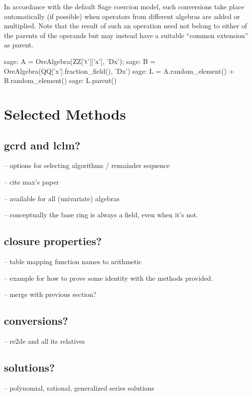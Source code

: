 \documentclass{amsart}
\begin{document}
In accordance with the default Sage coercion model, such conversions take place automatically (if possible) 
when operators from different algebras are added or multiplied. Note that the result of such an operation
need not belong to either of the parents of the operands but may instead have a suitable ``common extension'' 
as parent. 

\begin{sageexample}
  sage: A = OreAlgebra(ZZ['t']['x'], 'Dx'); 
  sage: B = OreAlgebra(QQ['x'].fraction_field(), 'Dx')
  sage: L = A.random_element() + B.random_element()
  sage: L.parent()
\end{sageexample}

\section{Selected Methods}\label{sec:4}

\subsection{gcrd and lclm?}

-- options for selecting algorithms / remainder sequence

-- cite max's paper

-- available for all (univariate) algebras

-- conceptually the base ring is always a field, even when it's not. 

\subsection{closure properties?}

-- table mapping function names to arithmetic

-- example for how to prove some identity with the methods provided. 

-- merge with previous section?

\subsection{conversions?}

-- re2de and all its relatives

\subsection{solutions?}

-- polynomial, rational, generalized series solutions
\end{document}
